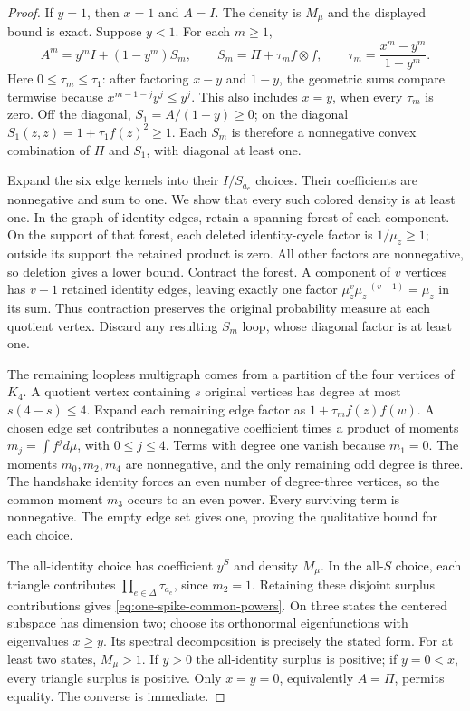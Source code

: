 \begin{proof}
If $y=1$, then $x=1$ and $A=I$.  The density is $M_\mu$ and the
displayed bound is exact.  Suppose $y<1$.  For each $m\geq1$,
\[
 A^m=y^mI+(1-y^m)S_m,\qquad
 S_m=\Pi+\tau_m f\otimes f,\qquad
 \tau_m=\frac{x^m-y^m}{1-y^m}.
\]
Here $0\leq\tau_m\leq\tau_1$: after factoring $x-y$ and $1-y$,
the geometric sums compare termwise because
$x^{m-1-j}y^j\leq y^j$.  This also includes $x=y$, when every
$\tau_m$ is zero.  Off the diagonal, $S_1=A/(1-y)\geq0$;
on the diagonal $S_1(z,z)=1+\tau_1f(z)^2\geq1$.
Each $S_m$ is therefore a nonnegative convex combination of $\Pi$ and
$S_1$, with diagonal at least one.

Expand the six edge kernels into their $I/S_{a_e}$ choices.  Their
coefficients are nonnegative and sum to one.  We show that every such
colored density is at least one.  In the graph of identity edges, retain
a spanning forest of each component.  On the support of that forest,
each deleted identity-cycle factor is $1/\mu_z\geq1$; outside its
support the retained product is zero.  All other factors are nonnegative,
so deletion gives a lower bound.  Contract the forest.  A component of
$v$ vertices has $v-1$ retained identity edges, leaving exactly one
factor $\mu_z^v\mu_z^{-(v-1)}=\mu_z$ in its sum.  Thus contraction
preserves the original probability measure at each quotient vertex.
Discard any resulting $S_m$ loop, whose diagonal factor is at least one.

The remaining loopless multigraph comes from a partition of the four
vertices of $K_4$.  A quotient vertex containing $s$ original vertices
has degree at most $s(4-s)\leq4$.  Expand each remaining edge factor as
$1+\tau_m f(z)f(w)$.  A chosen edge set contributes a nonnegative
coefficient times a product of moments
$m_j=\int f^j d\mu$, with $0\leq j\leq4$.
Terms with degree one vanish because $m_1=0$.
The moments $m_0,m_2,m_4$ are nonnegative, and the only remaining odd
degree is three.  The handshake identity forces an even number of
degree-three vertices, so the common moment $m_3$ occurs to an even
power.  Every surviving term is nonnegative.  The empty edge set gives
one, proving the qualitative bound for each choice.

The all-identity choice has coefficient $y^S$ and density $M_\mu$.
In the all-$S$ choice, each triangle contributes
$\prod_{e\in\Delta}\tau_{a_e}$, since $m_2=1$.
Retaining these disjoint surplus contributions gives
\eqref{eq:one-spike-common-powers}.
On three states the centered subspace has dimension two; choose its
orthonormal eigenfunctions with eigenvalues $x\geq y$.
Its spectral decomposition is precisely the stated form.
For at least two states, $M_\mu>1$.  If $y>0$ the all-identity surplus
is positive; if $y=0<x$, every triangle surplus is positive.
Only $x=y=0$, equivalently $A=\Pi$, permits equality.
The converse is immediate.
\end{proof}


